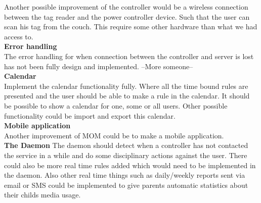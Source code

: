 Another possible improvement of the controller would be a wireless connection between the tag reader and the power controller device. Such that the user can scan his tag from the couch. This require some other hardware than what we had access to.\\

\textbf{Error handling}\\
The error handling for when connection between the controller and server is lost has not been fully design and implemented.  --More someone--\\

\textbf{Calendar}\\
Implement the calendar functionality fully. Where all the time bound rules are presented and the user should be able to make a rule in the calendar. It should be possible to show a calendar for one, some or all users. Other possible functionality could be import and export this calendar.\\

\textbf{Mobile application}\\
Another improvement of MOM could be to make a mobile application.\\

\textbf{The Daemon}
The daemon should detect when a controller has not contacted the service in a while and do some disciplinary actions against the user. There could also be more real time rules added which would need to be implemented in the daemon. Also other real time things such as daily/weekly reports sent via email or SMS could be implemented to give parents automatic statistics about their childs media usage. 